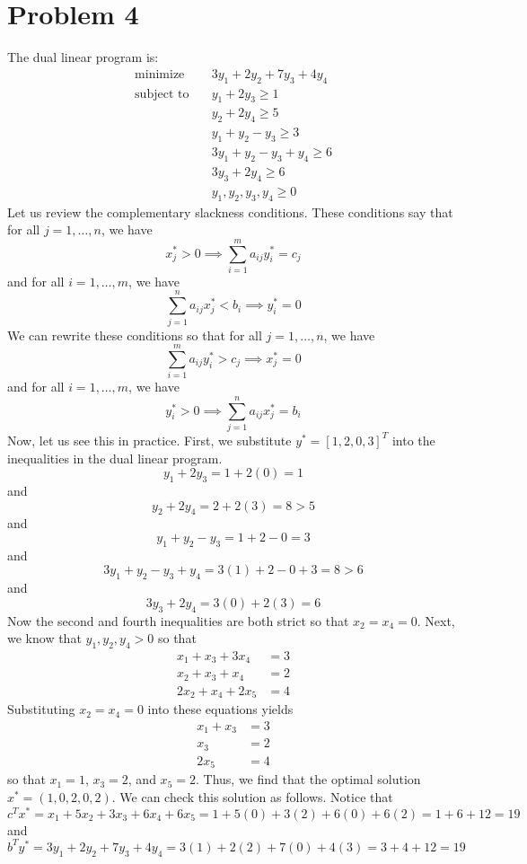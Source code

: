\documentclass[12pt]{article}
\begin{document}
\section*{Problem 4}
The dual linear program is:
\begin{align*}
\text{minimize}\quad &3y_1 + 2y_2 + 7y_3 + 4y_4\\
\text{subject to}\quad & y_1 + 2y_3 \geq 1\\
& y_2 + 2y_4 \geq 5\\
& y_1 + y_2 - y_3 \geq 3\\
& 3y_1 + y_2 - y_3 + y_4 \geq 6\\
&  3y_3 + 2y_4 \geq 6\\
& y_1,y_2,y_3,y_4 \geq 0
\end{align*} Let us review the complementary slackness conditions. These conditions say that for all $j = 1,\ldots,n$, we have
\[
x^*_j > 0 \implies \sum_{i=1}^m a_{ij}y_i^* = c_j
\] and for all $i = 1,\ldots,m$, we have
\[
\sum_{j=1}^n a_{ij}x_j^* < b_i \implies y_i^* = 0
\] We can rewrite these conditions so that for all $j = 1,\ldots,n$, we have
\[
\sum_{i=1}^m a_{ij}y_i^* > c_j \implies x_j^* = 0
\] and for all $i = 1,\ldots,m$, we have
\[
y_i^* > 0 \implies \sum_{j=1}^n a_{ij} x_j^* = b_i
\] Now, let us see this in practice. First, we substitute $y^* = [1,2,0,3]^T$ into the inequalities in the dual linear program.
\[
y_1 + 2y_3 = 1 + 2(0) = 1
\] and
\[
y_2 + 2y_4 = 2 + 2(3) = 8 > 5
\] and
\[
y_1 + y_2 - y_3 = 1 + 2 - 0 = 3
\] and
\[
3y_1 + y_2 - y_3 + y_4 = 3(1) + 2 - 0 + 3 = 8 > 6
\] and
\[
3y_3 + 2y_4 = 3(0) + 2(3) = 6
\] Now the second and fourth inequalities are both strict so that $x_2 = x_4 = 0$. Next, we know that $y_1,y_2,y_4 > 0$ so that 
\begin{align*}
x_1 + x_3 + 3x_4 &= 3\\
x_2+x_3+x_4 &= 2\\
2x_2 + x_4 + 2x_5 &= 4
\end{align*} Substituting $x_2 = x_4 = 0$ into these equations yields
\begin{align*}
x_1 + x_3&= 3\\
x_3 &= 2\\
2x_5 &= 4
\end{align*}
so that $x_1  = 1$, $x_3 = 2$, and $x_5 = 2$. Thus, we find that the optimal solution $x^* = (1,0,2,0,2)$. We can check this solution as follows. Notice that
\[
c^Tx^* = x_1 + 5x_2 + 3x_3 + 6x_4 + 6x_5 = 1 + 5(0) + 3(2) + 6(0) + 6(2) = 1 + 6 + 12 = 19
\] and
\[
b^Ty^* = 3y_1 + 2y_2 + 7y_3 + 4y_4 = 3(1) + 2(2) + 7(0) + 4(3) = 3 + 4 + 12 = 19
\]
\end{document}
